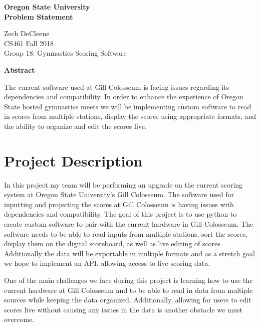 \documentclass[a4paper, 10pt, draftclsnofoot, onecolumn]{article}
\begin{document}
\begin{titlepage}
    \begin{center}
        \vspace*{1cm}
        \textbf{\huge Oregon State University}\\
        \vspace{1cm}
        \textbf{\LARGE Problem Statement}
        
        \vspace{0.5cm}
        \Large Zech DeCleene \\
        \Large CS461 Fall 2018\\
        \Large Group 18: Gymnastics Scoring Software
         \vspace*{\fill}
        \begin{center}
            \textbf{\large{Abstract}}
        \end{center}
        \normalsize{The current software used at Gill Colosseum is facing issues regarding its dependencies and compatibility. In order to enhance the experience of Oregon State hosted gymnastics meets we will be implementing custom software to read in scores from multiple stations, display the scores using appropriate formats, and the ability to organize and edit the scores live.}
        


    \end{center}
\end{titlepage}



\section*{Project Description}
In this project my team will be performing an upgrade on the current scoring system at Oregon State University's Gill Colosseum. The software used for inputting and projecting the scores at Gill Colosseum is having issues with dependencies and compatibility. The goal of this project is to use python to create custom software to pair with the current hardware in Gill Colosseum. The software needs to be able to read inputs from multiple stations, sort the scores, display them on the digital scoreboard, as well as live editing of scores. Additionally the data will be exportable in multiple formats and as a stretch goal we hope to implement an API, allowing access to live scoring data.

One of the main challenges we face during this project is learning how to use the current hardware at Gill Colosseum and to be able to read in data from multiple sources while keeping the data organized. Additionally, allowing for users to edit scores live without causing any issues in the data is another obstacle we must overcome. 
\end{document}
